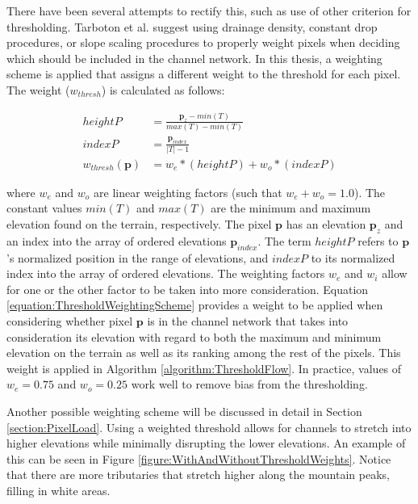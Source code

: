 There have been several attempts to rectify this, such as use of other criterion for thresholding. Tarboton et al. \cite{Tarboton-OnExtraction} suggest using drainage density, constant drop procedures, or slope scaling procedures to properly weight pixels when deciding which should be included in the channel network. In this thesis, a weighting scheme is applied that assigns a different weight to the threshold for each pixel. The weight ($w_{thresh}$) is calculated as follows:

\begin{align}
  heightP & = \frac{ \textbf{p}_{z} - min\left(T\right) }{ max\left(T\right) - min\left(T\right) } \\
  indexP & = \frac{ \textbf{p}_{index} }{ |T| - 1 } \\
  w_{thresh}( \textbf{p} ) & = w_{e} * \left( heightP \right) + w_{o} * \left( indexP \right)
\label{equation:ThresholdWeightingScheme}
\end{align}


\noindent where $w_{e}$ and $w_{o}$ are linear weighting factors (such that $w_{e} + w_{o} = 1.0$). The constant values $min\left(T\right)$ and $max\left(T\right)$ are the minimum and maximum elevation found on the terrain, respectively. The pixel $\textbf{p}$ has an elevation $\textbf{p}_{z}$ and an index into the array of ordered elevations $\textbf{p}_{index}$. The term $heightP$ refers to $\textbf{p}$'s normalized position in the range of elevations, and $indexP$ to its normalized index into the array of ordered elevations. The weighting factors $w_{e}$ and $w_{i}$ allow for one or the other factor to be taken into more consideration. Equation \ref{equation:ThresholdWeightingScheme} provides a weight to be applied when considering whether pixel $\textbf{p}$ is in the channel network that takes into consideration its elevation with regard to both the maximum and minimum elevation on the terrain as well as its ranking among the rest of the pixels. This weight is applied in Algorithm \ref{algorithm:ThresholdFlow}. In practice, values of $w_{e} = 0.75$ and $w_{o} = 0.25$ work well to remove bias from the thresholding.

Another possible weighting scheme will be discussed in detail in Section \ref{section:PixelLoad}.
Using a weighted threshold allows for channels to stretch into higher elevations while minimally disrupting the lower elevations. An example of this can be seen in Figure \ref{figure:WithAndWithoutThresholdWeights}. Notice that there are more tributaries that stretch higher along the mountain peaks, filling in white areas.

